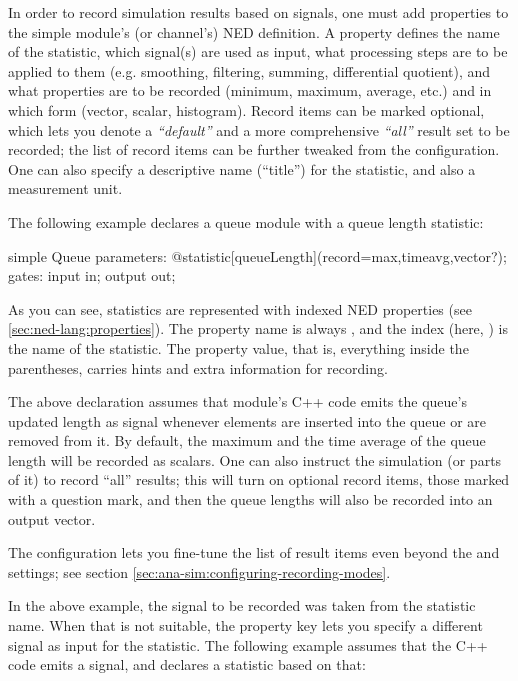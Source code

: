\begin{ned}
In order to record simulation results based on signals, one must add
 properties to the simple module's (or channel's) NED
definition. A  property defines the name of the
statistic, which signal(s) are used as input, what processing steps are to
be applied to them (e.g. smoothing, filtering, summing, differential
quotient), and what properties are to be recorded (minimum, maximum,
average, etc.) and in which form (vector, scalar, histogram). Record items
can be marked optional, which lets you denote a \textit{``default''} and a
more comprehensive \textit{``all''} result set to be recorded; the list of
record items can be further tweaked from the configuration. One can also
specify a descriptive name (``title'') for the statistic, and also a
measurement unit.

The following example declares a queue module with a queue length statistic:

\begin{ned}
simple Queue
{
    parameters:
        @statistic[queueLength](record=max,timeavg,vector?);
    gates:
        input in;
        output out;
}
\end{ned}

As you can see, statistics are represented with indexed NED properties (see
\ref{sec:ned-lang:properties}). The property name is always
, and the index (here, ) is the
name of the statistic. The property value, that is, everything inside the
parentheses, carries hints and extra information for recording.

The above  declaration assumes that module's C++ code
emits the queue's updated length as signal  whenever
elements are inserted into the queue or are removed from it.
By default, the maximum and the time average of the queue length will
be recorded as scalars. One can also instruct the simulation (or parts
of it) to record ``all'' results; this will turn on optional record items,
those marked with a question mark, and then the queue lengths will also be
recorded into an output vector.

\begin{note}
The configuration lets you fine-tune the list of result items even
beyond the  and  settings; see section
\ref{sec:ana-sim:configuring-recording-modes}.
\end{note}

In the above example, the signal to be recorded was taken from the
statistic name. When that is not suitable, the  property key
lets you specify a different signal as input for the statistic. The
following example assumes that the C++ code emits a  signal, and
declares a  statistic based on that:


\end{ned}
